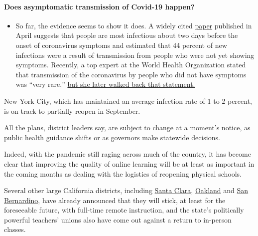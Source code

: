 \begin{itemize}
{  \paragraph{Does asymptomatic transmission of Covid-19
  happen?}\label{does-asymptomatic-transmission-of-covid-19-happen}}

  \begin{itemize}
  \tightlist
  \item
    So far, the evidence seems to show it does. A widely cited
    \href{https://www.nature.com/articles/s41591-020-0869-5}{paper}
    published in April suggests that people are most infectious about
    two days before the onset of coronavirus symptoms and estimated that
    44 percent of new infections were a result of transmission from
    people who were not yet showing symptoms. Recently, a top expert at
    the World Health Organization stated that transmission of the
    coronavirus by people who did not have symptoms was ``very rare,''
    \href{https://www.nytimes.com/2020/06/09/world/coronavirus-updates.html?action=click\&pgtype=Article\&state=default\&region=MAIN_CONTENT_3\&context=storylines_faq\#link-1f302e21}{but
    she later walked back that statement.}
  \end{itemize}
\end{itemize}

New York City, which has maintained an average infection rate of 1 to 2
percent, is on track to partially reopen in September.

All the plans, district leaders say, are subject to change at a moment's
notice, as public health guidance shifts or as governors make statewide
decisions.

Indeed, with the pandemic still raging across much of the country, it
has become clear that improving the quality of online learning will be
at least as important in the coming months as dealing with the logistics
of reopening physical schools.

Several other large California districts, including
\href{https://www.sfchronicle.com/bayarea/article/Santa-Clara-area-school-district-delays-return-to-15403000.php}{Santa
Clara}, \href{https://www.ousd.org/covid-19updates}{Oakland} and
\href{https://www.sbcusd.com/news/what_s_new/July22020_message_from_interim_superintendent}{San
Bernardino}, have already announced that they will stick, at least for
the foreseeable future, with full-time remote instruction, and the
state's politically powerful teachers' unions also have come out against
a return to in-person classes.

